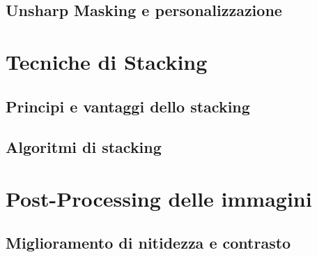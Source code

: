 \subsection{Unsharp Masking e personalizzazione} \label{subsec:unsharp_mask}

\section{Tecniche di Stacking} \label{sec:stacking}

\subsection{Principi e vantaggi dello stacking} \label{subsec:stacking_intro}

\subsection{Algoritmi di stacking} \label{subsec:atacking_algo}

\section{Post-Processing delle immagini} \label{sec:postprocess}

\subsection{Miglioramento di nitidezza e contrasto} \label{subsec:contrast}

\cleardoublepage
